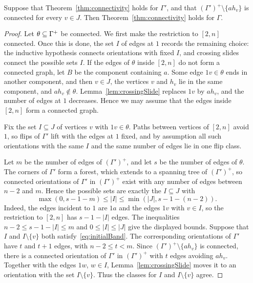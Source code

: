\begin{lemma}\label{lem:firstVertex}
Suppose that Theorem~\ref{thm:connectivity} holds for $\Gamma'$, and that
$(\Gamma')^{+}\setminus\{ah_v\}$ is connected for every $v\in J$.
Then Theorem~\ref{thm:connectivity} holds for $\Gamma$.
\end{lemma}

\begin{proof}
Let $\theta\subseteq\Gamma^{+}$ be connected.
We first make the restriction to $[2,n]$ connected.
Once this is done, the set $I$ of edges at $1$ records the remaining choice:
the inductive hypothesis connects orientations with fixed $I$, and crossing
slides connect the possible sets $I$.
If the edges of $\theta$ inside $[2,n]$ do not form a connected graph, let $B$ be the
component containing $a$.
Some edge $1v\in\theta$ ends in another component, and then $v\in J$, the vertices
$v$ and $h_v$ lie in the same component, and $ah_v\notin\theta$.
Lemma~\ref{lem:crossingSlide} replaces $1v$ by $ah_v$, and the number of edges at $1$
decreases.
Hence we may assume that the edges inside $[2,n]$ form a connected graph.

Fix the set $I\subseteq J$ of vertices $v$ with $1v\in\theta$.
Paths between vertices of $[2,n]$ avoid $1$, so flips of $\Gamma'$ lift with the
edges at $1$ fixed, and by assumption all such orientations with the same $I$
and the same number of edges lie in one flip class.

Let $m$ be the number of edges of $(\Gamma')^{+}$, and let $s$ be the number of
edges of $\theta$.
The corners of $\Gamma'$ form a forest, which extends to a spanning tree of
$(\Gamma')^{+}$, so connected orientations of $\Gamma'$ in $(\Gamma')^{+}$ exist
with any number of edges between $n-2$ and $m$.
Hence the possible sets are exactly the $I\subseteq J$ with
\begin{equation}\label{eq:initialBand}
 \max(0,s-1-m)\leq|I|\leq\min(|J|,s-1-(n-2)).
\end{equation}
Indeed, the edges incident to $1$ are $1a$ and the edges $1v$ with $v\in I$,
so the restriction to $[2,n]$ has $s-1-|I|$ edges.
The inequalities $n-2\leq s-1-|I|\leq m$ and $0\leq|I|\leq|J|$ give
the displayed bounds.
Suppose that $I$ and $I\setminus\{v\}$ both satisfy~\eqref{eq:initialBand}.
The corresponding orientations of $\Gamma'$ have $t$ and $t+1$ edges, with
$n-2\leq t<m$.
Since $(\Gamma')^{+}\setminus\{ah_v\}$ is connected, there is a connected
orientation of $\Gamma'$ in $(\Gamma')^{+}$ with $t$ edges avoiding $ah_v$.
Together with the edges $1w$, $w\in I$, Lemma~\ref{lem:crossingSlide} moves it
to an
orientation with the set $I\setminus\{v\}$.
Thus the classes for $I$ and $I\setminus\{v\}$ agree.


\end{proof}
